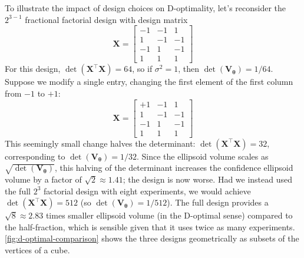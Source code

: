To illustrate the impact of design choices on D-optimality, let's reconsider the $2^{3-1}$ fractional factorial design with design matrix
\begin{equation}
    \mathbf{X} = \begin{bmatrix} -1 & -1 & 1 \\ 1 & -1 & -1 \\ -1 & 1 & -1 \\ 1 & 1 & 1 \end{bmatrix}
\end{equation}
For this design, $\det(\mathbf{X}^\top \mathbf{X}) = 64$, so if $\sigma^2 = 1$, then $\det(\mathbf{V}_{\boldsymbol{\theta}}) = 1/64$. Suppose we modify a single entry, changing the first element of the first column from $-1$ to $+1$:
\begin{equation}
    \mathbf{X} = \begin{bmatrix} +1 & -1 & 1 \\ 1 & -1 & -1 \\ -1 & 1 & -1 \\ 1 & 1 & 1 \end{bmatrix}
\end{equation}
This seemingly small change halves the determinant: $\det(\mathbf{X}^\top \mathbf{X}) = 32$, corresponding to $\det(\mathbf{V}_{\boldsymbol{\theta}}) = 1/32$. Since the ellipsoid volume scales as $\sqrt{\det(\mathbf{V}_{\boldsymbol{\theta}})}$, this halving of the determinant increases the confidence ellipsoid volume by a factor of $\sqrt{2}\approx1.41$; the design is now worse. Had we instead used the full $2^3$ factorial design with eight experiments, we would achieve $\det(\mathbf{X}^\top \mathbf{X}) = 512$ (so $\det(\mathbf{V}_{\boldsymbol{\theta}}) = 1/512$). The full design provides a $\sqrt{8}\approx2.83$ times smaller ellipsoid volume (in the D-optimal sense) compared to the half-fraction, which is sensible given that it uses twice as many experiments. \autoref{fig:d-optimal-comparison} shows the three designs geometrically as subsets of the vertices of a cube.

